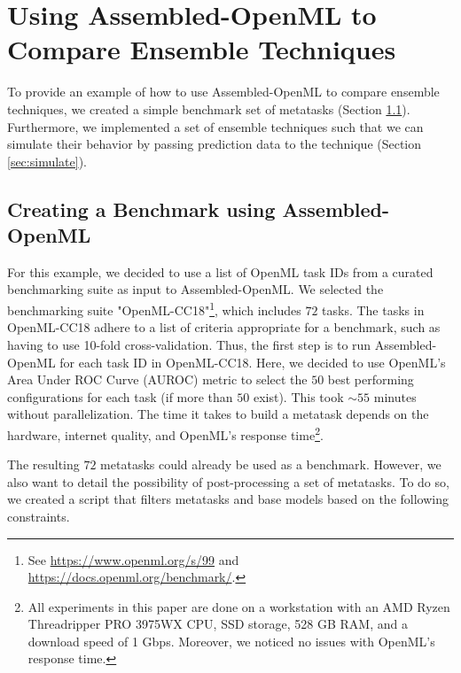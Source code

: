 \documentclass[11pt]{article}
\begin{document}
\section{Using Assembled-OpenML to Compare Ensemble Techniques}
To provide an example of how to use Assembled-OpenML to compare ensemble techniques, we created a simple benchmark set of metatasks (Section \ref{sec:createbenchmark}). Furthermore, we implemented a set of ensemble techniques such that we can simulate their behavior by passing prediction data to the technique (Section \ref{sec:simulate}).

\subsection{Creating a Benchmark using Assembled-OpenML}
\label{sec:createbenchmark}
For this example, we decided to use a list of OpenML task IDs from a curated benchmarking suite \citep{bischl2017openml} as input to Assembled-OpenML. 
We selected the benchmarking suite "OpenML-CC18"\footnote{See \url{https://www.openml.org/s/99} and \url{https://docs.openml.org/benchmark/}.}, which includes $72$ tasks. 
The tasks in OpenML-CC18 adhere to a list of criteria appropriate for a benchmark, such as having to use 10-fold cross-validation.
Thus, the first step is to run Assembled-OpenML for each task ID in OpenML-CC18. 
Here, we decided to use OpenML's Area Under ROC Curve (AUROC) metric to select the $50$ best performing configurations for each task (if more than $50$ exist). 
This took ${\sim} 55$ minutes without parallelization. 
The time it takes to build a metatask depends on the hardware, internet quality, and OpenML's response time\footnote{
All experiments in this paper are done on a workstation with an AMD Ryzen Threadripper PRO 3975WX CPU, SSD storage, 528 GB RAM, and a download speed of 1 Gbps. Moreover, we noticed no issues with OpenML's response time.}. 


The resulting $72$ metatasks could already be used as a benchmark.
However, we also want to detail the possibility of post-processing a set of metatasks. 
To do so, we created a script that filters metatasks and base models based on the following constraints.
\end{document}

